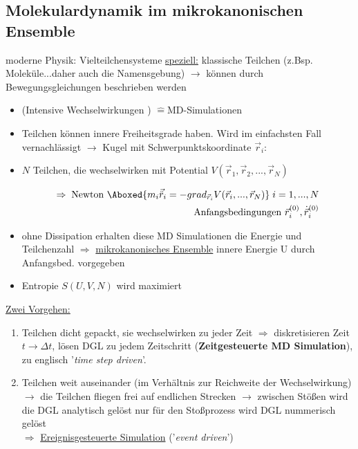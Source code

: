 \documentclass[12pt]{article}
\begin{document}
\subsection{Molekulardynamik im mikrokanonischen Ensemble}
 moderne Physik: Vielteilchensysteme
 \underline{speziell:} klassische Teilchen (z.Bsp. Moleküle...daher auch die Namensgebung)
 $\to$ können durch Bewegungsgleichungen beschrieben werden \\
 \begin{itemize}
 \item (Intensive Wechselwirkungen ) $\hat{=} $MD-Simulationen 
 \item Teilchen können innere Freiheitsgrade haben. Wird im einfachsten Fall vernachlässigt $\to $ Kugel mit Schwerpunktskoordinate $\vec{r}_i$:
 
 \item $N$ Teilchen, die wechselwirken mit Potential $V(\vec{r}_1,\vec{r}_2, ..., \vec{r}_N)$ 
 
 \begin{align}
 \Rightarrow \; \mbox{Newton } \Aboxed{ m_i \vec{\ddot{r}}_i = -grad_{\vec{r}_i} V(\vec{r}_i, ..., \vec{r}_N)} \; i=1,...,N \\
 \mbox{Anfangsbedingungen } \vec{r}_i^{(0)}, \dot{\vec{r}}_i^{(0)}
 \end{align}
 \item ohne Dissipation erhalten diese MD Simulationen die Energie und Teilchenzahl $\Rightarrow$ \underline{mikrokanonisches Ensemble} innere Energie U durch Anfangsbed. vorgegeben
 \item Entropie $S(U,V,N)$ wird maximiert
 
 \end{itemize}
 \underline{Zwei Vorgehen:}
 \begin{enumerate}
 \item Teilchen dicht gepackt, sie wechselwirken zu jeder Zeit $\Rightarrow$ diskretisieren Zeit $t \to \Delta t$, lösen DGL zu jedem Zeitschritt (\textbf{Zeitgesteuerte MD Simulation}), zu englisch '\textit{time step driven}'.
 \item Teilchen weit auseinander (im Verhältnis zur Reichweite der Wechselwirkung) $\to$ die Teilchen fliegen frei auf endlichen Strecken $\to$ zwischen Stößen wird die DGL analytisch gelöst nur für den Stoßprozess wird DGL nummerisch gelöst \\
 $\Rightarrow$ \underline{Ereignisgesteuerte Simulation} ('\textit{event driven}')
 
 \end{enumerate}
\end{document}
